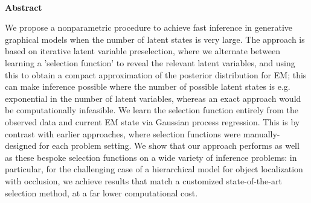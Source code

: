 \documentclass[12pt]{article}
\begin{document}
\thispagestyle{empty}
%
\ \vspace{-0mm}\\
%
\begin{center} 
{\bf Abstract} 
\end{center}
We propose a nonparametric procedure to achieve fast inference in generative graphical models when the number of latent states is very large.
 The approach is based on iterative latent variable preselection, where we alternate between learning a 'selection function' to reveal the relevant latent variables, and using this to obtain a compact approximation of the posterior distribution for EM; this can make inference possible where the number of possible latent states is e.g. exponential in the number of latent variables, whereas an exact approach would be computationally infeasible.
We learn the selection function entirely from the observed data and current EM state via Gaussian process regression. This is by contrast with earlier approaches, where selection functions were manually-designed for each problem setting.
We show that our approach performs as well as these bespoke selection functions on a wide variety of inference problems: in particular, for the challenging case of a hierarchical model for object localization with occlusion, we achieve results that match a customized state-of-the-art selection method,  at a far lower computational cost.







\iffalse
\section{Citations}
The citations must follow the APA format. A typical citation is given by $\backslash citep$, for example \citep{Ref2009}. The command $\backslash cite$ will generate \cite{Ref2009}. For references with multiple authors, the command $\backslash citet$ will generate \citet{Ref2008} and $\backslash citep$ will generate \citep{Ref2008}. To put texts in the reference, use command $\backslash citep[see, e.g.,][for instance]\{Ref2009\}$ which generates \citep[see,
e.g.,][for instance]{Ref2009}. To cite multiple references, use the command $\backslash citep\{ref1,ref2,ref3\}$, for example \citep[compare][]{Ref2008,Ref2009}.
For Neural Computation, the $\backslash citep$ is preferred.
\fi
\end{document}
